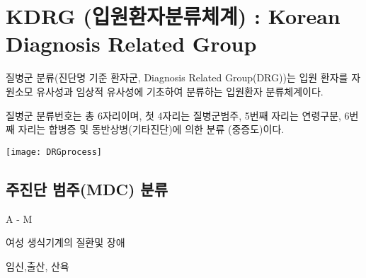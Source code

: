 \section{KDRG (입원환자분류체계) : Korean Diagnosis Related Group}
\par
\medskip   
질병군 분류(진단명 기준 환자군, Diagnosis Related Group(DRG))는 입원 환자를 자원소모 유사성과 임상적 유사성에 기초하여 분류하는 입원환자 분류체계이다.
\prezi{\clearpage}
\par
\medskip
질병군 분류번호는 총 6자리이며, 첫 4자리는 질병군범주, 5번째 자리는 연령구분, 6번째 자리는 합병증 및 동반상병(기타진단)에 의한 분류 (중증도)이다. \par
\begin{center}
\texttt{[image: DRGprocess]}
\end{center}
\par
\medskip
\prezi{\clearpage}
\subsection{주진단 범주(MDC) 분류}
\begin{description}\tightlist
\item[\cntrdots{}] A - M
\item[13 N] 여성 생식기계의 질환및 장애
\item[14 O] 임신,출산, 산욕
\end{description}
\prezi{\clearpage}
